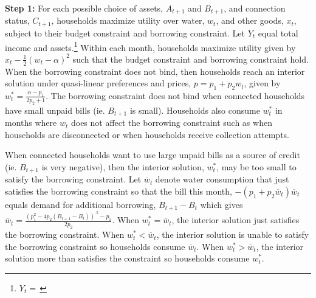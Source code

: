 \documentclass[12pt]{article}
\begin{document}
\textbf{Step 1:} For each possible choice of assets, $A_{t+1}$ and $B_{t+1}$, and connection status, $C_{t+1}$, households maximize utility over water, $w_t$, and other goods, $x_t$, subject to their budget constraint and borrowing constraint.  Let $Y_t$ equal total income and assets.\footnote{$Y_t=\, $}  Within each month, households maximize utility given by $ x_t -  \frac{1}{2} (w_t - \alpha)^2 $ such that the budget constraint and borrowing constraint hold.
When the borrowing constraint does not bind, then households reach an interior solution under quasi-linear preferences and prices, $p=p_1+p_2w_t$, given by $w_t^{*} =  \frac{ \alpha - p_1}{2p_2 + 1}$.  The borrowing constraint does not bind when connected households have small unpaid bills (ie. $B_{t+1}$ is small).  Households also consume $w_t^{*}$ in months where $w_t$ does not affect the borrowing constraint such as when households are disconnected or when households receive collection attempts.



When connected households want to use large unpaid bills as a source of credit (ie. $B_{t+1}$ is very negative), then the  interior solution, $w_t^{*}$, may be too small to satisfy the borrowing constraint.  Let $\overline{w}_t$ denote water consumption that just satisfies the borrowing constraint so that the bill this month, $-(p_1 +p_2\overline{w}_t)\overline{w}_t$ equals demand for additional borrowing, $B_{t+1}-B_{t}$ which gives $\overline{w}_t = \frac{(p_1^2 - 4p_2 (B_{t+1}-B_{t}))^{.5} - p_1}{2 p_2}$.  When $w_t^{*}=\overline{w}_t$, the interior solution just satisfies the borrowing constraint.  When $w_t^{*}<\overline{w}_t$, the interior solution is unable to satisfy the borrowing constraint so households consume $\overline{w}_t$.  When $w_t^{*}>\overline{w}_t$, the  interior solution more than satisfies the constraint so households consume $w_t^{*}$.
\end{document}
